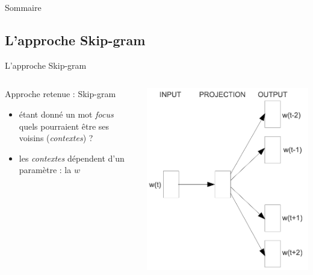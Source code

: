 \documentclass[10pt,xcolor=table,color={dvipsnames,usenames},ignorenonframetext,usepdftitle=false,french]{beamer}
\begin{document}
\begin{frame}{Sommaire}
\protect\hypertarget{sommaire}{}


\end{frame}

\hypertarget{lapproche-skip-gram}{%
\subsection{L'approche Skip-gram}\label{lapproche-skip-gram}}

\begin{frame}{L'approche Skip-gram}
\protect\hypertarget{lapproche-skip-gram-1}{}

\begin{columns}
\begin{column}{0.65\textwidth}
Approche retenue : Skip-gram
\begin{itemize}
\item étant donné un mot \emph{focus} quels pourraient être ses voisins (\emph{contextes}) ?
\item les \emph{contextes} dépendent d'un paramètre : la  $w$
\end{itemize}
\medskip

\medskip {}
\end{column}
\begin{column}{0.4\textwidth} 
\includegraphics[width=\textwidth]{img/skip_gram.png}


\end{column}
\end{columns}
\end{frame}
\end{document}
